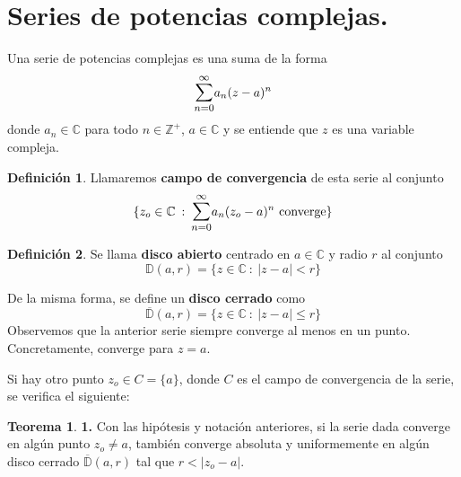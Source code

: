 \documentclass[12pt,twoside]{report}
\theoremstyle{azul}
\theoremstyle{azul2}
\theoremstyle{plain}
\theoremstyle{definition}
\newtheorem{defin}{Definición}[chapter]
\newtheorem*{theo}{Teorema}
\theoremstyle{remark}
\begin{document}
\section{Series de potencias complejas.}
Una serie de potencias complejas es una suma de la forma
$$\mathlarger{\sum_{n=0}^{\infty}} a_n (z-a)^n$$ donde $a_n \in \mathbb{C}$ para todo $n \in \mathbb{Z}^+$, $a \in \mathbb{C}$ y se entiende que $z$ es una variable compleja. 

\begin{defin}
Llamaremos \textbf{campo de convergencia} de esta serie al conjunto $$\{z_o \in \mathbb{C} \: : \: \mathlarger{\sum_{n=0}^{\infty}} a_n (z_o-a)^n \text{ converge}\}$$
\end{defin}


\begin{defin}
Se llama \textbf{disco abierto} centrado en $a \in \mathbb{C}$ y radio $r$ al conjunto 
$$\mathbb{D}(a,r) = \{z \in \mathbb{C} \: : \: |z-a| < r\}$$

De la misma forma, se define un \textbf{disco cerrado} como 
$$\overline{\mathbb{D}}(a,r) = \{z \in \mathbb{C} \: : \: |z-a| \leq r\}$$
Observemos que la anterior serie siempre converge al menos en un punto. Concretamente, converge para $z=a$.

Si hay otro punto $z_o \in C = \{a\}$, donde $C$ es el campo de convergencia de la serie, se verifica el siguiente:
\end{defin}
\begin{theo} \label{teo111} \textbf{1.} Con las hipótesis y notación anteriores, si la serie dada converge en algún punto $z_o \neq a$, también converge absoluta y uniformemente en algún disco cerrado $\overline{\mathbb{D}}(a,r)$ tal que  $r < |z_o - a|$. 
\end{theo}
\end{document}
